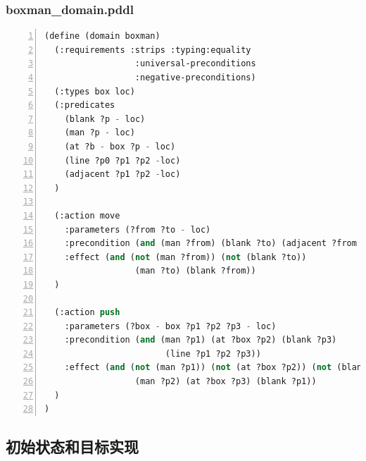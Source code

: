 \documentclass[a4paper, 11pt]{article}
\begin{document}
\subsubsection{boxman\_domain.pddl}
\begin{lstlisting}[title=boxman\_domain.pddl,frame=single,language=lisp,numbers=left]
(define (domain boxman)
  (:requirements :strips :typing:equality
                  :universal-preconditions
                  :negative-preconditions)
  (:types box loc)
  (:predicates
    (blank ?p - loc)
    (man ?p - loc)
    (at ?b - box ?p - loc)
    (line ?p0 ?p1 ?p2 -loc)
    (adjacent ?p1 ?p2 -loc)
  )   

  (:action move
    :parameters (?from ?to - loc)
    :precondition (and (man ?from) (blank ?to) (adjacent ?from ?to))
    :effect (and (not (man ?from)) (not (blank ?to))
                  (man ?to) (blank ?from))
  )

  (:action push
    :parameters (?box - box ?p1 ?p2 ?p3 - loc)
    :precondition (and (man ?p1) (at ?box ?p2) (blank ?p3)
                        (line ?p1 ?p2 ?p3))
    :effect (and (not (man ?p1)) (not (at ?box ?p2)) (not (blank ?p3))
                  (man ?p2) (at ?box ?p3) (blank ?p1))
  )
)
\end{lstlisting}
\subsection{初始状态和目标实现}
\end{document}
